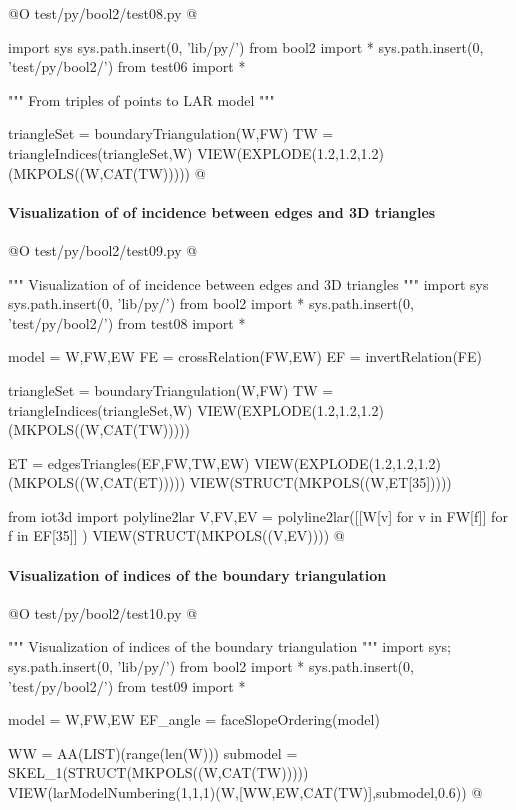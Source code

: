 \documentclass[11pt,oneside]{article}    %
\begin{document}
@O test/py/bool2/test08.py @{
import sys
sys.path.insert(0, 'lib/py/')
from bool2 import *
sys.path.insert(0, 'test/py/bool2/')
from test06 import *

""" From triples of points to LAR model """

triangleSet = boundaryTriangulation(W,FW)
TW = triangleIndices(triangleSet,W)
VIEW(EXPLODE(1.2,1.2,1.2)(MKPOLS((W,CAT(TW)))))
@}



\paragraph{Visualization of of incidence between edges and 3D triangles}

@O test/py/bool2/test09.py @{
""" Visualization of of incidence between edges and 3D triangles """
import sys
sys.path.insert(0, 'lib/py/')
from bool2 import *
sys.path.insert(0, 'test/py/bool2/')
from test08 import *

model = W,FW,EW
FE = crossRelation(FW,EW)
EF = invertRelation(FE)

triangleSet = boundaryTriangulation(W,FW)
TW = triangleIndices(triangleSet,W)
VIEW(EXPLODE(1.2,1.2,1.2)(MKPOLS((W,CAT(TW)))))

ET = edgesTriangles(EF,FW,TW,EW)
VIEW(EXPLODE(1.2,1.2,1.2)(MKPOLS((W,CAT(ET)))))
VIEW(STRUCT(MKPOLS((W,ET[35]))))

from iot3d import polyline2lar
V,FV,EV = polyline2lar([[W[v] for v in FW[f]] for f in EF[35]] )
VIEW(STRUCT(MKPOLS((V,EV))))
@}



\paragraph{Visualization of indices of the boundary triangulation}

@O test/py/bool2/test10.py @{
""" Visualization of indices of the boundary triangulation """
import sys; sys.path.insert(0, 'lib/py/')
from bool2 import *
sys.path.insert(0, 'test/py/bool2/')
from test09 import *

model = W,FW,EW
EF_angle = faceSlopeOrdering(model)

WW = AA(LIST)(range(len(W)))
submodel = SKEL_1(STRUCT(MKPOLS((W,CAT(TW)))))
VIEW(larModelNumbering(1,1,1)(W,[WW,EW,CAT(TW)],submodel,0.6))
@}
\end{document}
